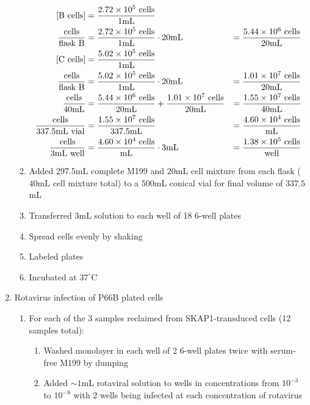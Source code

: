 \begin{enumerate}
\begin{enumerate}
				\begin{align*}
				\text{[B cells]} &= \frac{2.72\times 10^{5}\text{ cells}}{1\text{mL}} \\
				\frac{\text{cells}}{\text{flask B}} &= \frac{2.72\times 10^{5}\text{ cells}}{1\text{mL}} \cdot 20\text{mL} &= \frac{5.44\times 10^{6}\text{ cells}}{20\text{mL}}\\
				\text{[C cells]} &= \frac{5.02\times 10^{5}\text{ cells}}{1\text{mL}} \\
				\frac{\text{cells}}{\text{flask B}} &= \frac{5.02\times 10^{5}\text{ cells}}{1\text{mL}} \cdot 20\text{mL} &= \frac{1.01\times 10^{7}\text{ cells}}{20\text{mL}}\\
				\frac{\text{cells}}{\text{40\text{mL}}} &=
				\frac{5.44\times 10^{6}\text{ cells}}{20\text{mL}}+\frac{1.01\times 10^{7}\text{ cells}}{20\text{mL}} &=
				\frac{1.55\times 10^{7}\text{ cells}}{40\text{mL}}\\
				\frac{\text{cells}}{337.5\text{mL vial}} &= \frac{1.55\times 10^{7}\text{ cells}}{337.5\text{mL}} &= \frac{4.60\times 10^{4}\text{ cells}}{\text{mL}}\\
				\frac{\text{cells}}{3\text{mL well}} &= \frac{4.60\times 10^{4}\text{ cells}}{\text{mL}} \cdot 3\text{mL} &= \frac{1.38\times 10^{5}\text{ cells}}{\text{well}}\\
				\end{align*}
			\item Added $297.5$mL complete M199 and $20$mL cell mixture from each flask ($40$mL cell mixture total) to a $500$mL conical vial for final volume of $337.5$mL
			\item Transferred $3$mL solution to each well of 18 6-well plates
			\item Spread cells evenly by shaking
			\item Labeled plates
			\item Incubated at $37^{\circ}$C
		\end{enumerate}
	\item Rotavirus infection of P66B plated cells
		\begin{enumerate}
			\item For each of the 3 samples reclaimed from SKAP1-transduced cells (12 samples total):
				\begin{enumerate}
					\item Washed monolayer in each well of 2 6-well plates twice with serum-free M199 by dumping
					\item Added $\sim 1$mL rotaviral solution to wells in concentrations from $10^{-3}$ to $10^{-8}$ with 2 wells being infected at each concentration of rotavirus

\end{enumerate}
\end{enumerate}
\end{enumerate}
